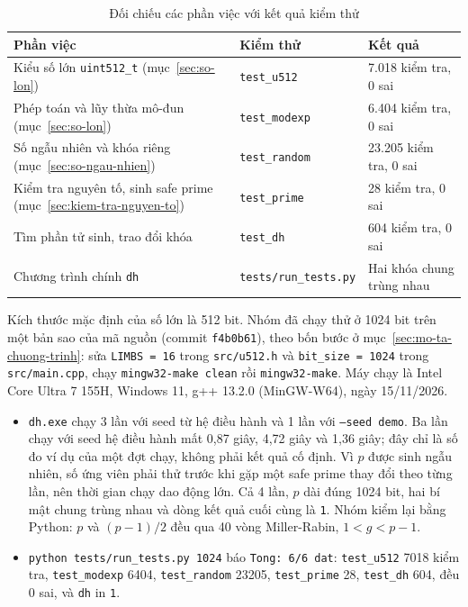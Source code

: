 \begin{table}[h!]
\centering
\small
\begin{tabular}{p{5.4cm}p{4.2cm}p{3.6cm}}
\toprule
\textbf{Phần việc} & \textbf{Kiểm thử} & \textbf{Kết quả} \\
\midrule
Kiểu số lớn \texttt{uint512\_t} (mục~\ref{sec:so-lon}) & \texttt{test\_u512} & 7.018 kiểm tra, 0 sai \\
Phép toán và lũy thừa mô-đun (mục~\ref{sec:so-lon}) & \texttt{test\_modexp} & 6.404 kiểm tra, 0 sai \\
Số ngẫu nhiên và khóa riêng (mục~\ref{sec:so-ngau-nhien}) & \texttt{test\_random} & 23.205 kiểm tra, 0 sai \\
Kiểm tra nguyên tố, sinh safe prime (mục~\ref{sec:kiem-tra-nguyen-to}) & \texttt{test\_prime} & 28 kiểm tra, 0 sai \\
Tìm phần tử sinh, trao đổi khóa & \texttt{test\_dh} & 604 kiểm tra, 0 sai \\
Chương trình chính \texttt{dh} & \texttt{tests/run\_tests.py} & Hai khóa chung trùng nhau \\
\bottomrule
\end{tabular}
\caption{Đối chiếu các phần việc với kết quả kiểm thử}
\label{tab:hoan-thanh}
\end{table}

Kích thước mặc định của số lớn là 512 bit. Nhóm đã chạy thử ở 1024 bit trên một bản sao của mã nguồn (commit \texttt{f4b0b61}), theo bốn bước ở mục~\ref{sec:mo-ta-chuong-trinh}: sửa \texttt{LIMBS = 16} trong \texttt{src/u512.h} và \texttt{bit\_size = 1024} trong \texttt{src/main.cpp}, chạy \texttt{mingw32-make clean} rồi \texttt{mingw32-make}. Máy chạy là Intel Core Ultra 7 155H, Windows 11, g++ 13.2.0 (MinGW-W64), ngày 15/11/2026.
\begin{itemize}
  \item \texttt{dh.exe} chạy 3 lần với seed từ hệ điều hành và 1 lần với \texttt{--seed demo}. Ba lần chạy với seed hệ điều hành mất 0,87 giây, 4,72 giây và 1,36 giây; đây chỉ là số đo ví dụ của một đợt chạy, không phải kết quả cố định. Vì $p$ được sinh ngẫu nhiên, số ứng viên phải thử trước khi gặp một safe prime thay đổi theo từng lần, nên thời gian chạy dao động lớn. Cả 4 lần, $p$ dài đúng 1024 bit, hai bí mật chung trùng nhau và dòng kết quả cuối cùng là \texttt{1}. Nhóm kiểm lại bằng Python: $p$ và $(p-1)/2$ đều qua 40 vòng Miller-Rabin, $1 < g < p - 1$.
  \item \texttt{python tests/run\_tests.py 1024} báo \texttt{Tong: 6/6 dat}: \texttt{test\_u512} 7018 kiểm tra, \texttt{test\_modexp} 6404, \texttt{test\_random} 23205, \texttt{test\_prime} 28, \texttt{test\_dh} 604, đều 0 sai, và \texttt{dh} in \texttt{1}.
\end{itemize}

